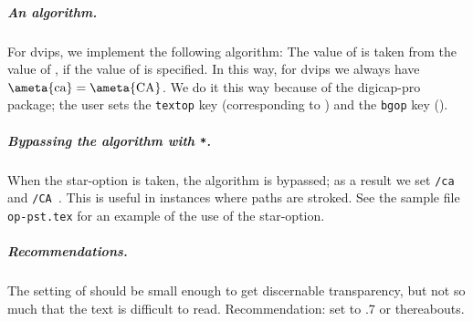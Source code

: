 \documentclass{article}
\let\pkg\textsf
\let\app\textsf
\begin{document}
\subparagraph*{An algorithm.} For \app{dvips}, we implement the following
algorithm: The value of  is taken from the value of , if
the value of  is specified. In this way, for \app{dvips} we always
have $\mbox{\ameta{ca}}=\mbox{\ameta{CA}}$. We do it this way because of the
\pkg{digicap-pro} package; the user sets the \texttt{textop} key
(corresponding to ) and the \texttt{bgop} key ().

\subparagraph*{Bypassing the algorithm with \texttt{*}.} When the star-option
is taken, the algorithm is bypassed; as a result we set \texttt{/ca
} and \texttt{/CA }. This is useful in instances where
paths are stroked. See the sample file \texttt{op-pst.tex} for an example of
the use of the star-option.

\subparagraph*{Recommendations.} The setting of  should be small
enough to get discernable transparency, but not so much that the text is
difficult to read. Recommendation: set  to .7 or thereabouts.
\end{document}
